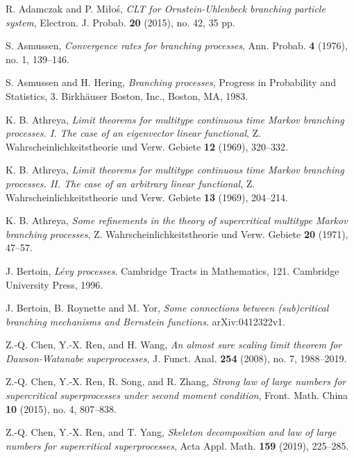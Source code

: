 \documentclass[EJP]{ejpecp} %
\begin{document}
\begin{thebibliography}{10}

  	R. Adamczak and P. Mi{\l}o\'{s},
  	\emph{C{LT} for {O}rnstein-{U}hlenbeck branching particle system},
  	Electron. J. Probab. \textbf{20} (2015), no. 42, 35 pp.

  	S. Asmussen,
  	\emph{Convergence rates for branching processes},
  	Ann. Probab.  \textbf{4} (1976), no. 1, 139--146.

  	S. Asmussen and H. Hering,
  	\emph{Branching processes},
  	Progress in Probability and Statistics, 3. Birkh\"{a}user Boston, Inc., Boston, MA, 1983.

  	K. B. Athreya,
  	\emph{Limit theorems for multitype continuous time {M}arkov branching processes. {I}. {T}he case of an eigenvector linear functional},
  	Z. Wahrscheinlichkeitstheorie und Verw. Gebiete \textbf{12} (1969), 320--332.

  	K. B. Athreya,
  	\emph{Limit theorems for multitype continuous time {M}arkov branching processes. {II}. {T}he case of an arbitrary linear functional},
  	Z. Wahrscheinlichkeitstheorie und Verw. Gebiete \textbf{13} (1969), 204--214.

  	K. B. Athreya,
  	\emph{Some refinements in the theory of supercritical multitype {M}arkov branching processes},
  	Z. Wahrscheinlichkeitstheorie und Verw. Gebiete \textbf{20} (1971), 47--57.


	J. Bertoin,
	\emph{L\'evy processes}.
	Cambridge Tracts in Mathematics, 121. Cambridge
	University Press, 1996.

	J. Bertoin, B. Roynette and M. Yor,
	\emph{Some connections between (sub)critical branching mechanisms and Bernstein functions}.
	arXiv:0412322v1.


	Z.-Q. Chen, Y.-X. Ren, and H. Wang,
  	\emph{An almost sure scaling limit theorem for {D}awson-{W}atanabe superprocesses},
  	J. Funct. Anal. \textbf{254} (2008), no. 7, 1988--2019.

   	Z.-Q. Chen, Y.-X. Ren, R. Song, and R. Zhang,
   	\emph{Strong law of large numbers for supercritical superprocesses under second moment condition},
   	Front. Math. China \textbf{10} (2015), no. 4, 807--838.

  	Z.-Q. Chen, Y.-X. Ren, and T. Yang,
   	\emph{Skeleton decomposition and law of large numbers for supercritical superprocesses},
   	Acta Appl. Math. \textbf{159} (2019), 225--285.


\end{thebibliography}
\end{document}
